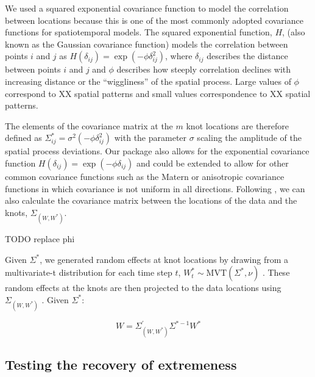 \documentclass[12pt,english]{article}
\begin{document}
\begin{spacing}{1.25}
We used a squared exponential covariance function to model the correlation
between locations because this is one of the most commonly adopted covariance
functions for spatiotemporal models. The squared exponential function, $H$,
(also known as the Gaussian covariance function) models the correlation between
points $i$ and $j$ as $H(\delta_{ij}) = \exp \left(-\phi \delta_{ij}^2
\right)$, where $\delta_{ij}$ describes the distance between points $i$ and $j$
and $\phi$ describes how steeply correlation declines with increasing distance
or the ``wiggliness'' of the spatial process. Large values of $\phi$ correspond
to XX spatial patterns and small values correspondence to XX spatial patterns.

The elements of the covariance matrix at the $m$ knot locations are therefore
defined as $\Sigma_{ij}^*=\sigma^2 \left( -\phi \delta_{ij}^2 \right)$ with the
parameter $\sigma$ scaling the amplitude of the spatial process deviations. Our
package also allows for the exponential covariance function $H(\delta_{ij}) =
\exp \left(-\phi \delta_{ij} \right)$ and could be extended to allow for other
common covariance functions such as the Matern or anisotropic covariance
functions in which covariance is not uniform in all directions. 
Following \citep{latimer2009}, we can also calculate the covariance matrix
between the locations of the data and the knots, 
$\Sigma_{\left(W, W^* \right)}$. 

TODO replace phi



Given $\Sigma^*$, we generated random effects at knot
locations by drawing from a multivariate-t distribution for each time step $t$, 
$W_t^*\sim \mathrm{MVT}\left( \Sigma^{*},\nu \right)$ .
These random effects at the knots are then projected to the data locations using
$\Sigma_{\left( W,W^{*} \right)}$ \citep{latimer2009}.
Given ${\Sigma}^{*}$:

\begin{equation}
W=\Sigma_{\left(W,W^* \right)}^{'} \Sigma^{*-1}W^*
\end{equation}

\subsection{Testing the recovery of extremeness}


\end{spacing}
\end{document}
